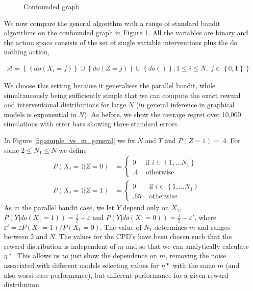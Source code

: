 \documentclass[11pt,a4paper,twoside]{report}
\newcommand{\calA}{\mathcal A}
\newcommand{\set}[1]{\left\{#1\right\}}
\newcommand{\eq}[1]{\begin{align*}#1\end{align*}}
\theoremstyle{plain}
\theoremstyle{definition}
\let\epsilon\varepsilon
\begin{document}
\begin{figure}[H]
	\centering    
        \caption{Confounded graph}
        \label{fig:parallel_confounded} 
\end{figure}


We now compare the general algorithm with a range of standard bandit algorithms on the confounded graph in Figure \ref{fig:parallel_confounded}. All the variables are binary and the action space consists of the set of single variable interventions plus the do nothing action, 

\eq{
\calA = \set{\set{do(X_i = j)} \cup \set{do(Z = j)} \cup \set{do()}: 1\leq i \leq N,\; j \in \set{0,1}}
} 

We choose this setting because it generalises the parallel bandit, while simultaneously being sufficiently simple that we can compute the exact reward and interventional distributions for large $N$ (in general inference in graphical models is exponential in $N$). As before, we show the average regret over 10,000 simulations with error bars showing three standard errors. 

In Figure \ref{fig:simple_vs_m_general} we fix $N$ and $T$ and $P(Z=1) = .4$. For some $2 \leq N_1 \leq N$ we define 
\eq{
P(X_i = 1|Z = 0) &= \begin{cases} 0 & \text{ if } i \in \set{1,...N_1} \\ .4 & \text{ otherwise } \end{cases}\\
P(X_i = 1|Z = 1) &= \begin{cases} 0 & \text{ if } i \in \set{1,...N_1} \\ .65 & \text{ otherwise } \end{cases}
}
As in the parallel bandit case, we let $Y$ depend only on $X_1$, $P(Y|do(X_1=1)) = \frac{1}{2} + \epsilon$ and $P(Y|do(X_1=0)) = \frac{1}{2}-\epsilon'$, where $\epsilon' = \epsilon P(X_1=1) / P(X_1=0)$. The value of $N_1$ determines $m$ and ranges between $2$ and $N$. The values for the CPD's have been chosen such that the reward distribution is independent of $m$ and so that we can analytically calculate $\eta*$. This allows us to just show the dependence on $m$, removing the noise associated with different models selecting values for $\eta*$ with the same $m$ (and also worst case performance), but different performance for a given reward distribution. 
\end{document}
